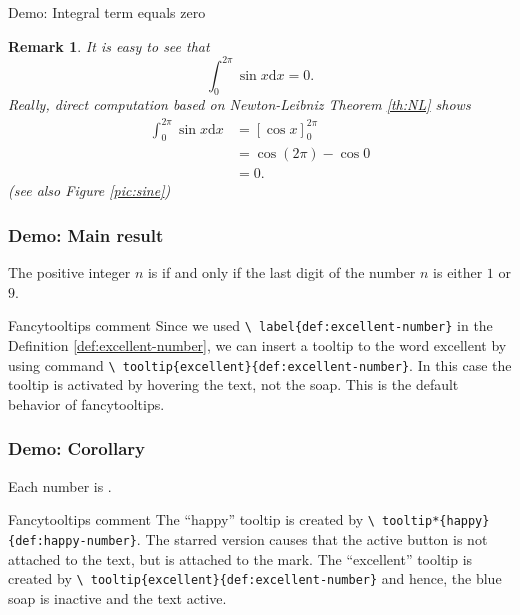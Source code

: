 \documentclass[envcountsect,t,10pt]{beamer}
\newtheorem{remark}{Remark}
\def\dx{{\mathrm d}x}
\begin{document}
\begin{frame}{Demo: Integral term equals zero}
  \begin{remark}
    It is easy to see that
    \begin{equation}
      \label{eq:sin}
      \int_0^{2\pi}\sin x\dx=0.
    \end{equation}
    Really, direct computation based on Newton-Leibniz Theorem
    \ref{th:NL} shows
    \begin{align*}
      \int_0^{2\pi}\sin x\dx&=[\cos x]_0^{2\pi}\\
      &=\cos(2\pi)-\cos 0\\
      &=0.
    \end{align*}
    (see also Figure \ref{pic:sine})
  \end{remark}
\end{frame}

\begin{frame}
  \frametitle{Demo:  Main result}
  \begin{theorem}
    The positive integer $n$ is
     if and only if the last
    digit of the number $n$ is either $1$ or $9$.
    \label{theorem}
  \end{theorem}

\begin{alertblock}{Fancytooltips comment}
  Since we used {\color{red}\texttt{\textbackslash
      label\{def:excellent-number\}}} in the Definition
  \ref{def:excellent-number}, we can insert a tooltip to the word
  excellent by using command{\color{red} \texttt{\textbackslash
      tooltip\{excellent\}\{def:excellent-number\}}}. In this case the
  tooltip is activated by hovering the text, not the soap. This is the
  default behavior of fancytooltips.
\end{alertblock}

\end{frame}

\begin{frame}
  \frametitle{Demo:  Corollary}
  \begin{theorem}
    Each  number is
    .
  \end{theorem}

\begin{alertblock}{Fancytooltips comment}
  The ``happy'' tooltip is created by
  \texttt{\color{red}\textbackslash
    tooltip*\{happy\}\{def:happy-number\}}. The starred version causes
  that the active button is not attached to the text, but is attached
  to the mark. The ``excellent'' tooltip is created by
  \texttt{\color{red}\textbackslash
    tooltip\{excellent\}\{def:excellent-number\}} and hence, the blue soap is
  inactive and the text active.
\end{alertblock}
\end{frame}
\end{document}
